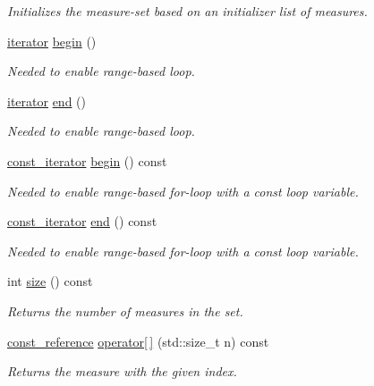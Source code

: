 \begin{DoxyCompactItemize}
\begin{DoxyCompactList}\small\item\em Initializes the measure-\/set based on an initializer list of measures. \end{DoxyCompactList}\item 
\hyperlink{structMeasureSet_ae27132ddda27621abc1178a3fb3744b3}{iterator} \hyperlink{structMeasureSet_a52dc81c49e4e0116765f6c2399723ff0}{begin} ()
\begin{DoxyCompactList}\small\item\em Needed to enable range-\/based loop. \end{DoxyCompactList}\item 
\hyperlink{structMeasureSet_ae27132ddda27621abc1178a3fb3744b3}{iterator} \hyperlink{structMeasureSet_abaea10a7aabe9766ae83717d82b55a19}{end} ()
\begin{DoxyCompactList}\small\item\em Needed to enable range-\/based loop. \end{DoxyCompactList}\item 
\hyperlink{structMeasureSet_af26a4657a3e2a42f86409a7604f1876e}{const\+\_\+iterator} \hyperlink{structMeasureSet_a1698050c23dd31afb957918bfe50949f}{begin} () const 
\begin{DoxyCompactList}\small\item\em Needed to enable range-\/based for-\/loop with a const loop variable. \end{DoxyCompactList}\item 
\hyperlink{structMeasureSet_af26a4657a3e2a42f86409a7604f1876e}{const\+\_\+iterator} \hyperlink{structMeasureSet_acf1951c87618406fed81fea80fc479e0}{end} () const 
\begin{DoxyCompactList}\small\item\em Needed to enable range-\/based for-\/loop with a const loop variable. \end{DoxyCompactList}\item 
int \hyperlink{structMeasureSet_a681d1374e259bc3b81e4419aa20e7c30}{size} () const 
\begin{DoxyCompactList}\small\item\em Returns the number of measures in the set. \end{DoxyCompactList}\item 
\hyperlink{structMeasureSet_aa294da3254d6c95367732ae64056b3c0}{const\+\_\+reference} \hyperlink{structMeasureSet_aa734b46cd89f0c066de6705b7e27968a}{operator\mbox{[}$\,$\mbox{]}} (std\+::size\+\_\+t n) const 
\begin{DoxyCompactList}\small\item\em Returns the measure with the given index. \end{DoxyCompactList}\item 

\end{DoxyCompactItemize}
